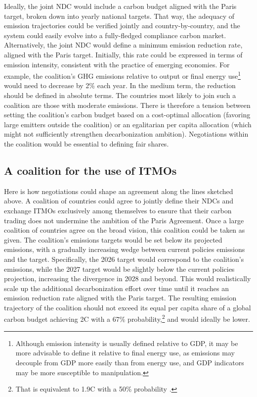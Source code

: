 ﻿\documentclass[12pt,english]{article}
\begin{document}
Ideally, the joint NDC would include a carbon budget aligned with the Paris target, broken down into yearly national targets. That way, the adequacy of emission trajectories could be verified jointly and country-by-country, 
and the system could easily evolve into a fully-fledged compliance carbon market. 
Alternatively, the joint NDC would define a minimum emission reduction rate, aligned with the Paris target. Initially, this rate could be expressed in terms of emission intensity, consistent with the practice of emerging economies. For example, the coalition's GHG emissions relative to output or final energy use\footnote{Although emission intensity is usually defined relative to GDP, it may be more advisable to define it relative to final energy use, as emissions may decouple from GDP more easily than from energy use, and GDP indicators may be more susceptible to manipulation.} %
would need to decrease by 2\% each year. In the medium term, the reduction should be defined in absolute terms.
The countries most likely to join such a coalition are those with moderate emissions. There is therefore a tension between setting the coalition's carbon budget based on a cost-optimal allocation (favoring large emitters outside the coalition) or an egalitarian per capita allocation (which might not sufficiently strengthen decarbonization ambition). Negotiations within the coalition would be essential to defining fair shares.
\subsection{A coalition for the use of ITMOs\label{subsec:itmo}}

Here is how negotiations could shape an agreement along the lines sketched above. A coalition of countries could agree to jointly define their NDCs and exchange ITMOs exclusively among themselves to ensure that their carbon trading does not undermine the ambition of the Paris Agreement. 
Once a large coalition of countries agree on the broad vision, this coalition could be taken as given. The coalition's emissions targets would be set below its projected emissions, with a gradually increasing wedge between current policies emissions and the target. Specifically, the 2026 target would correspond to the coalition's emissions, %
while the 2027 target would be slightly below the current policies projection, increasing the divergence in 2028 and beyond. This would realistically scale up the additional decarbonization effort over time 
until it reaches an emission reduction rate aligned with the Paris target. 
The resulting emission trajectory of the coalition should not exceed its equal per capita share of a global carbon budget achieving 2\textdegree{}C with a 67\% probability,\footnote{That is equivalent to 1.9\textdegree{}C with a 50\% probability \citep{forster_indicators_2025}.} and would ideally be lower. %
\end{document}
